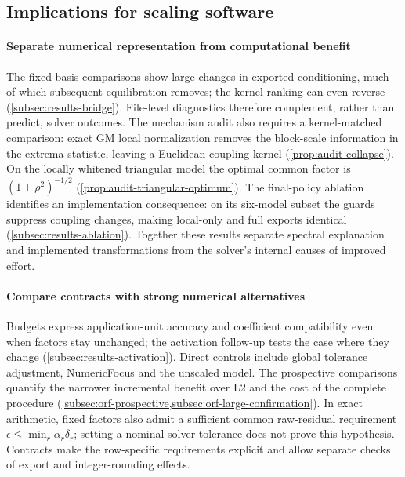 \subsection{Implications for scaling software}
\paragraph{Separate numerical representation from computational benefit}
The fixed-basis comparisons show large changes in exported conditioning, much
of which subsequent equilibration removes; the kernel ranking can even reverse
(\cref{subsec:results-bridge}). File-level diagnostics therefore complement,
rather than predict, solver outcomes. The mechanism audit also requires a
kernel-matched comparison: exact GM local normalization removes the block-scale
information in the extrema statistic, leaving a Euclidean coupling kernel
(\cref{prop:audit-collapse}). On the locally whitened triangular model the optimal
common factor is $(1+\rho^2)^{-1/2}$ (\cref{prop:audit-triangular-optimum}).
The final-policy ablation identifies an implementation consequence: on its
six-model subset the guards suppress coupling changes, making local-only and
full exports identical (\cref{subsec:results-ablation}). Together these results
separate spectral explanation and implemented transformations from the solver's
internal causes of improved effort.

\paragraph{Compare contracts with strong numerical alternatives}
Budgets express application-unit accuracy and coefficient compatibility even
when factors stay unchanged; the activation follow-up tests the case where
they change (\cref{subsec:results-activation}). Direct controls include global
tolerance adjustment, NumericFocus and the unscaled model. The prospective comparisons quantify the narrower incremental benefit over L2
and the cost of the complete procedure (\cref{subsec:orf-prospective,subsec:orf-large-confirmation}).
In exact arithmetic,
fixed factors also admit a sufficient common raw-residual requirement
$\epsilon\le\min_r\alpha_r\delta_r$; setting a nominal solver tolerance does not
prove this hypothesis. Contracts make the row-specific requirements explicit
and allow separate checks of export and integer-rounding effects.

